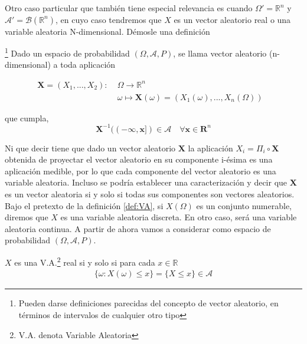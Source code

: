     Otro caso particular que también tiene especial relevancia es cuando $\Omega' = \mathbb{R}^n$ y $\mathcal{A}' = \mathcal{B}(\mathbb{R}^n)$, en cuyo caso tendremos que $X$ es un vector aleatorio real o una variable aleatoria N-dimensional. Démosle una definición
    
        \begin{definicion}\footnote{Pueden darse definiciones parecidas del concepto de vector aleatorio, en términos de intervalos de cualquier otro tipo}
            Dado un espacio de probabilidad $(\Omega, \mathcal{A}, P)$, se llama vector aleatorio (n-dimensional) a toda aplicación
     
                
                \begin{align}
                    \mathbf{X} = (X_1,...,X_2): \; & \Omega \to \mathbb{R}^n &\\
                    & \omega \mapsto \mathbf{X}(\omega) = (X_1(\omega),...,X_n(\Omega))
                \end{align}
                
            que cumpla,
            $$\mathbf{X}^{-1}((-\infty,\mathbf{x}]) \in \mathcal{A} \quad \forall \mathbf{x} \in \mathbf{R}^n$$
        \end{definicion}
        
    Ni que decir tiene que dado un vector aleatorio $\mathbf{X}$ la aplicación $X_i = \Pi_i \circ \mathbf{X}$ obtenida de proyectar el vector aleatorio en su componente i-ésima es una aplicación medible, por lo que cada componente del vector aleatorio es una variable aleatoria. Incluso se podría establecer una caracterización y decir que $\mathbf{X}$ es un vector aleatoria si y solo si todas sus componentes son vectores aleatorios. \\
    
    Bajo el pretexto de la definición \ref{def:VA}, si $X(\Omega)$ es un conjunto numerable, diremos que $X$ es una variable aleatoria discreta. En otro caso, será una variable aleatoria continua. A partir de ahora vamos a considerar como espacio de probabilidad $(\Omega, \mathcal{A},P)$. \\
    
        \begin{teorema}
        $X$ es una V.A.\footnote{V.A. denota Variable Aleatoria} real si y solo si para cada $x \in \mathbb{R}$ 
            \begin{align}
                \{\omega: X(\omega)\leq x\} = \{X \leq x\} \in \mathcal{A}
            \end{align}
        
        \end{teorema}
    

